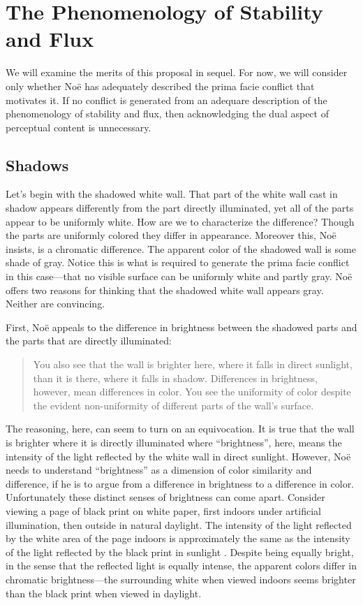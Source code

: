 \documentclass[12pt]{article}
\begin{document}

\section{The Phenomenology of Stability and Flux}\label{sec:stability_and_flux} %

We will examine the merits of this proposal in sequel. For now, we will consider only whether Noë has adequately described the prima facie conflict that motivates it. If no conflict is generated from an adequare description of the phenomenology of stability and flux, then acknowledging the dual aspect of perceptual content is unnecessary.

\subsection{Shadows} %
\label{sub:shadows}

Let's begin with the shadowed white wall. That part of the white wall cast in shadow appears differently from the part directly illuminated, yet all of the parts appear to be uniformly white. How are we to characterize the difference? Though the parts are uniformly colored they differ in appearance. Moreover this, Noë insists, is a chromatic difference. The apparent color of the shadowed wall is some shade of gray. Notice this is what is required to generate the prima facie conflict in this case---that no visible surface can be uniformly white and partly gray. Noë offers two reasons for thinking that the shadowed white wall appears gray. Neither are convincing.

First, Noë appeals to the difference in brightness between the shadowed parts and the parts that are directly illuminated:
	\begin{quote}
		You also see that the wall is brighter here, where it falls in direct sunlight, than it is there, where it falls in shadow. Differences in brightness, however, mean differences in color. You see the uniformity of color despite the evident non-uniformity of different parts of the wall's surface. \citep[127]{Noe:2004fk}
	\end{quote}
The reasoning, here, can seem to turn on an equivocation. It is true that the wall is brighter where it is directly illuminated where ``brightness'', here, means the intensity of the light reflected by the white wall in direct sunlight. However, Noë needs to understand ``brightness'' as a dimension of color similarity and difference, if he is to argue from a difference in brightness to a difference in color. Unfortunately these distinct senses of brightness can come apart. Consider viewing a page of black print on white paper, first indoors under artificial illumination, then outside in natural daylight. The intensity of the light reflected by the white area of the page indoors is approximately the same as the intensity of the light reflected by the black print in sunlight \citep[199]{Peter-K:1996th}. Despite being equally bright, in the sense that the reflected light is equally intense, the apparent colors differ in chromatic brightness---the surrounding white when viewed indoors seems brighter than the black print when viewed in daylight.
\end{document}
